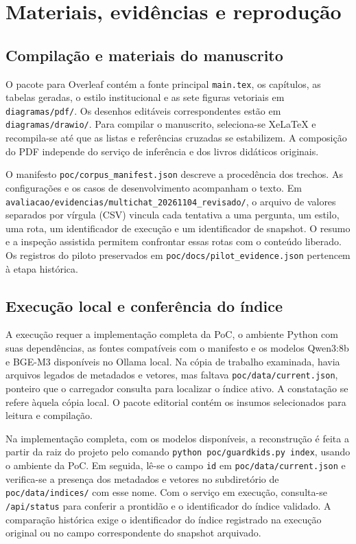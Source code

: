 \chapter{Materiais, evidências e reprodução}\label{ap:reproducao}

\section{Compilação e materiais do manuscrito}

O pacote para Overleaf contém a fonte principal \nolinkurl{main.tex}, os capítulos, as tabelas geradas, o estilo institucional e as sete figuras vetoriais em \nolinkurl{diagramas/pdf/}. Os desenhos editáveis correspondentes estão em \nolinkurl{diagramas/drawio/}. Para compilar o manuscrito, seleciona-se XeLaTeX e recompila-se até que as listas e referências cruzadas se estabilizem. A composição do PDF independe do serviço de inferência e dos livros didáticos originais.

O manifesto \nolinkurl{poc/corpus_manifest.json} descreve a procedência dos trechos. As configurações e os casos de desenvolvimento acompanham o texto. Em \nolinkurl{avaliacao/evidencias/multichat_20261104_revisado/}, o arquivo de valores separados por vírgula (CSV) vincula cada tentativa a uma pergunta, um estilo, uma rota, um identificador de execução e um identificador de snapshot. O resumo e a inspeção assistida permitem confrontar essas rotas com o conteúdo liberado. Os registros do piloto preservados em \nolinkurl{poc/docs/pilot_evidence.json} pertencem à etapa histórica.

\section{Execução local e conferência do índice}

A execução requer a implementação completa da PoC, o ambiente Python com suas dependências, as fontes compatíveis com o manifesto e os modelos Qwen3:8b e BGE-M3 disponíveis no Ollama local. Na cópia de trabalho examinada, havia arquivos legados de metadados e vetores, mas faltava \nolinkurl{poc/data/current.json}, ponteiro que o carregador consulta para localizar o índice ativo. A constatação se refere àquela cópia local. O pacote editorial contém os insumos selecionados para leitura e compilação.

Na implementação completa, com os modelos disponíveis, a reconstrução é feita a partir da raiz do projeto pelo comando \nolinkurl{python poc/guardkids.py index}, usando o ambiente da PoC. Em seguida, lê-se o campo \texttt{id} em \nolinkurl{poc/data/current.json} e verifica-se a presença dos metadados e vetores no subdiretório de \nolinkurl{poc/data/indices/} com esse nome. Com o serviço em execução, consulta-se \nolinkurl{/api/status} para conferir a prontidão e o identificador do índice validado. A comparação histórica exige o identificador do índice registrado na execução original ou no campo correspondente do snapshot arquivado.

